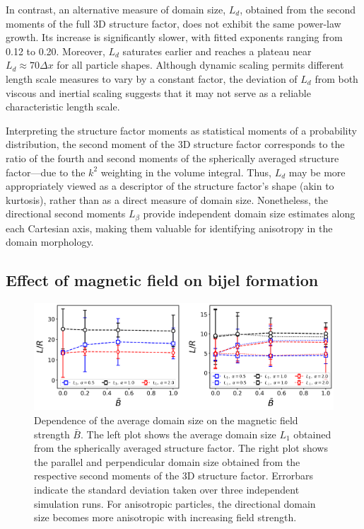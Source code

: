In contrast, an alternative measure of domain size, \(L_d\), obtained from the second moments of the full 3D structure factor, does not exhibit the same 
power-law growth. Its increase is significantly slower, with fitted exponents ranging from 0.12 to 0.20. Moreover, \(L_d\) saturates earlier and reaches a 
plateau near \(L_d \approx 70 \Delta x\) for all particle shapes. Although dynamic scaling permits different length scale measures to vary by a constant 
factor, the deviation of \(L_d\) from both viscous and inertial scaling suggests that it may not serve as a reliable characteristic length scale.
    
Interpreting the structure factor moments as statistical moments of a probability distribution, the second moment of the 3D structure factor corresponds to 
the ratio of the fourth and second moments of the spherically averaged structure factor—due to the \(k^2\) weighting in the volume integral. Thus, \(L_d\) 
may be more appropriately viewed as a descriptor of the structure factor's shape (akin to kurtosis), rather than as a direct measure of domain size.
Nonetheless, the directional second moments \(L_\beta\) provide independent domain size estimates along each Cartesian axis, making them valuable for 
identifying anisotropy in the domain morphology.
    
    
\subsection{Effect of magnetic field on bijel formation}
    
    \begin{figure}
    \centering
    \includegraphics[width=\columnwidth]{../figures/results/paper1/D2a-vs-B_ss.png}
    \caption{Dependence of the average domain size on the magnetic field strength $\bar{B}$. The left plot shows the average domain size $L_1$ obtained from the spherically averaged structure factor. The right plot shows the parallel and perpendicular domain size obtained from the respective second moments of the 3D structure factor. Errorbars indicate the standard deviation taken over three independent simulation runs. For anisotropic particles, the directional domain size becomes more anisotropic with increasing field strength.}
    \label{fig:D2a_B}
    \end{figure}

